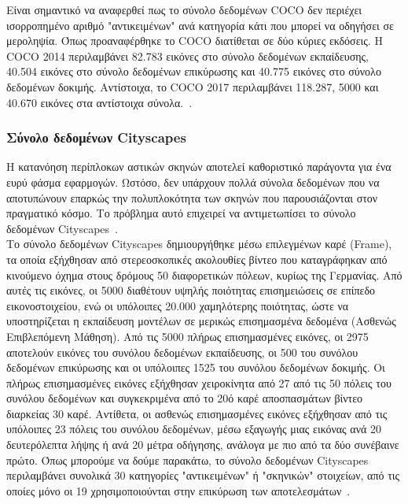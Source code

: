 \documentclass[12pt]{article}
\numberwithin{equation}{section}
\begin{document}
\noindent Είναι σημαντικό να αναφερθεί πως το σύνολο δεδομένων COCO δεν περιέχει ισορροπημένο αριθμό "αντικειμένων" ανά κατηγορία κάτι που μπορεί να οδηγήσει σε μεροληψία. Όπως προαναφέρθηκε το COCO διατίθεται σε δύο κύριες εκδόσεις. Η COCO 2014 περιλαμβάνει 82.783 εικόνες στο σύνολο δεδομένων εκπαίδευσης, 40.504 εικόνες στο σύνολο δεδομένων επικύρωσης και 40.775 εικόνες στο σύνολο δεδομένων δοκιμής. Αντίστοιχα, το COCO 2017 περιλαμβάνει 118.287, 5000 και 40.670 εικόνες στα αντίστοιχα σύνολα.~\cite{fan2021tao}. \\


\subsubsection{Σύνολο δεδομένων Cityscapes}

Η κατανόηση περίπλοκων αστικών σκηνών αποτελεί καθοριστικό παράγοντα για ένα ευρύ φάσμα εφαρμογών. Ωστόσο, δεν υπάρχουν πολλά σύνολα δεδομένων που να αποτυπώνουν επαρκώς την πολυπλοκότητα των σκηνών που παρουσιάζονται στον πραγματικό κόσμο. Το πρόβλημα αυτό επιχειρεί να αντιμετωπίσει το σύνολο δεδομένων Cityscapes~\cite{DBLP:journals/corr/CordtsORREBFRS16}. \\


Το σύνολο δεδομένων Cityscapes δημιουργήθηκε μέσω επιλεγμένων καρέ (Frame), τα οποία εξήχθησαν από στερεοσκοπικές ακολουθίες βίντεο που καταγράφηκαν από κινούμενο όχημα στους δρόμους 50 διαφορετικών πόλεων, κυρίως της Γερμανίας. Από αυτές τις εικόνες, οι 5000 διαθέτουν υψηλής ποιότητας επισημειώσεις σε επίπεδο εικονοστοιχείου, ενώ οι υπόλοιπες 20.000 χαμηλότερης ποιότητας, ώστε να υποστηρίζεται η εκπαίδευση μοντέλων σε μερικώς επισημασμένα δεδομένα (Ασθενώς Επιβλεπόμενη Μάθηση). Από τις 5000 πλήρως επισημασμένες εικόνες, οι 2975 αποτελούν εικόνες του συνόλου δεδομένων εκπαίδευσης, οι 500 του συνόλου δεδομένων επικύρωσης και οι υπόλοιπες 1525 του συνόλου δεδομένων δοκιμής. Οι πλήρως επισημασμένες εικόνες εξήχθησαν χειροκίνητα από 27 από τις 50 πόλεις του συνόλου δεδομένων και συγκεκριμένα από το 20ό καρέ αποσπασμάτων βίντεο διαρκείας 30 καρέ. Αντίθετα, οι ασθενώς επισημασμένες εικόνες εξήχθησαν από τις υπόλοιπες 23 πόλεις του συνόλου δεδομένων, μέσω εξαγωγής μιας εικόνας ανά 20 δευτερόλεπτα λήψης ή ανά 20 μέτρα οδήγησης, ανάλογα με πιο από τα δύο συνέβαινε πρώτο. Όπως μπορούμε να δούμε παρακάτω, το σύνολο δεδομένων Cityscapes περιλαμβάνει συνολικά 30 κατηγορίες "αντικειμένων" ή "σκηνικών" στοιχείων, από τις οποίες μόνο οι 19 χρησιμοποιούνται στην επικύρωση των αποτελεσμάτων~\cite{DBLP:journals/corr/CordtsORREBFRS16}.\\
\end{document}
